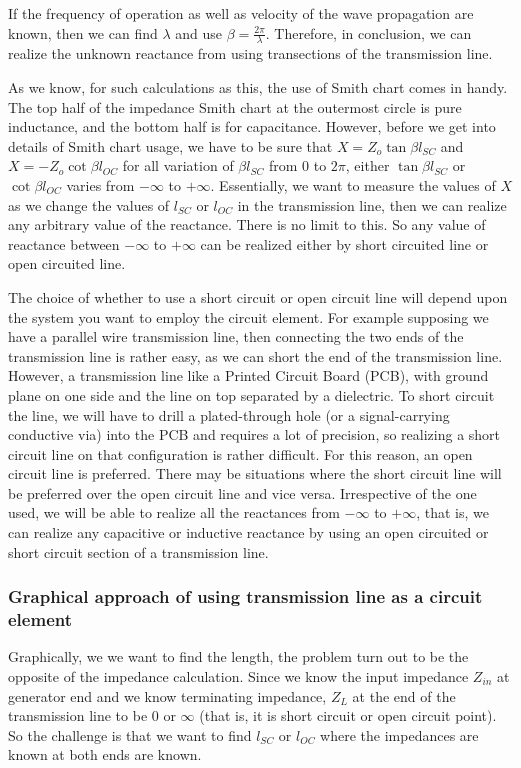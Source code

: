 If the frequency of operation as well as velocity of the wave propagation are known, then we can find $\lambda$ and use $\beta = \frac{2\pi}{\lambda} $. Therefore, in conclusion, we can realize the unknown reactance from using transections of the transmission line. 

As we know, for such calculations as this, the use of Smith chart comes in handy. The top half of the impedance Smith chart at the outermost circle is pure inductance, and the bottom half is for capacitance. However, before we get into details of Smith chart usage, we have to be sure that $X = Z_o\tan\beta l_{SC}$ and $X = -Z_o\cot\beta l_{OC}$ for all variation of $\beta l_{SC}$  from 0 to $ 2\pi $, either $\tan\beta l_{SC}$ or $\cot\beta l_{OC}$ varies from $-\infty$ to $+\infty$. Essentially, we want to measure the values of $X$ as we change the values of $l_{SC}$ or $l_{OC}$ in the transmission line, then we can realize any arbitrary value of the reactance. There is no limit to this. So any value of reactance between $-\infty$ to $+\infty$ can be realized either by short circuited line or open circuited line.

The choice of whether to use a short circuit or open circuit line will depend upon the system you want to employ the circuit element. For example supposing we have a parallel wire transmission line, then connecting the two ends of the transmission line is rather easy, as we can short the end of the transmission line. However, a transmission line like a Printed Circuit Board (PCB), with ground plane on one side and the line on top separated by a dielectric. To short circuit the line, we will have to drill a plated-through hole (or a signal-carrying conductive via) into the PCB and requires a lot of precision, so realizing a short circuit line on that configuration is rather difficult. For this reason, an open circuit line is preferred. There may be situations where the short circuit line will be preferred over the open circuit line and vice versa. Irrespective of the one used, we will be able to realize all the reactances from  $ -\infty$ to $+\infty $, that is, we can realize any capacitive or inductive reactance by using an open circuited or short circuit section of a transmission line.

\subsubsection{Graphical approach of using transmission line as a circuit element}
Graphically, we we want to find the length, the problem turn out to be the opposite of the impedance calculation. Since we know the input impedance $Z_{in}$ at generator end  and we know terminating impedance, $Z_{L}$ at the end of the transmission line to be 0 or $\infty$ (that is, it is short circuit or open circuit point). So the challenge is that we want to find $ l_{SC} $ or $ l_{OC} $ where the impedances are known at both ends are known.

